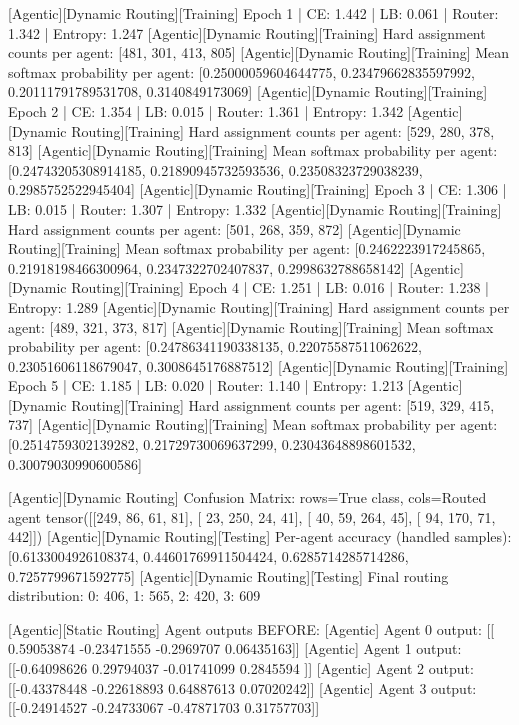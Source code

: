 [Agentic][Dynamic Routing][Training] Epoch 1 | CE: 1.442 | LB: 0.061 | Router: 1.342 | Entropy: 1.247
[Agentic][Dynamic Routing][Training] Hard assignment counts per agent: [481, 301, 413, 805]
[Agentic][Dynamic Routing][Training] Mean softmax probability per agent: [0.25000059604644775, 0.23479662835597992, 0.20111791789531708, 0.3140849173069]
[Agentic][Dynamic Routing][Training] Epoch 2 | CE: 1.354 | LB: 0.015 | Router: 1.361 | Entropy: 1.342
[Agentic][Dynamic Routing][Training] Hard assignment counts per agent: [529, 280, 378, 813]
[Agentic][Dynamic Routing][Training] Mean softmax probability per agent: [0.24743205308914185, 0.21890945732593536, 0.23508323729038239, 0.2985752522945404]
[Agentic][Dynamic Routing][Training] Epoch 3 | CE: 1.306 | LB: 0.015 | Router: 1.307 | Entropy: 1.332
[Agentic][Dynamic Routing][Training] Hard assignment counts per agent: [501, 268, 359, 872]
[Agentic][Dynamic Routing][Training] Mean softmax probability per agent: [0.2462223917245865, 0.21918198466300964, 0.2347322702407837, 0.2998632788658142]
[Agentic][Dynamic Routing][Training] Epoch 4 | CE: 1.251 | LB: 0.016 | Router: 1.238 | Entropy: 1.289
[Agentic][Dynamic Routing][Training] Hard assignment counts per agent: [489, 321, 373, 817]
[Agentic][Dynamic Routing][Training] Mean softmax probability per agent: [0.24786341190338135, 0.22075587511062622, 0.23051606118679047, 0.3008645176887512]
[Agentic][Dynamic Routing][Training] Epoch 5 | CE: 1.185 | LB: 0.020 | Router: 1.140 | Entropy: 1.213
[Agentic][Dynamic Routing][Training] Hard assignment counts per agent: [519, 329, 415, 737]
[Agentic][Dynamic Routing][Training] Mean softmax probability per agent: [0.2514759302139282, 0.21729730069637299, 0.23043648898601532, 0.30079030990600586]

[Agentic][Dynamic Routing] Confusion Matrix: rows=True class, cols=Routed agent
tensor([[249,  86,  61,  81],
[ 23, 250,  24,  41],
[ 40,  59, 264,  45],
[ 94, 170,  71, 442]])
[Agentic][Dynamic Routing][Testing] Per-agent accuracy (handled samples): [0.6133004926108374, 0.44601769911504424, 0.6285714285714286, 0.7257799671592775]
[Agentic][Dynamic Routing][Testing] Final routing distribution: {0: 406, 1: 565, 2: 420, 3: 609}

[Agentic][Static Routing] Agent outputs BEFORE:
[Agentic] Agent 0 output: [[ 0.59053874 -0.23471555 -0.2969707   0.06435163]]
[Agentic] Agent 1 output: [[-0.64098626  0.29794037 -0.01741099  0.2845594 ]]
[Agentic] Agent 2 output: [[-0.43378448 -0.22618893  0.64887613  0.07020242]]
[Agentic] Agent 3 output: [[-0.24914527 -0.24733067 -0.47871703  0.31757703]]


